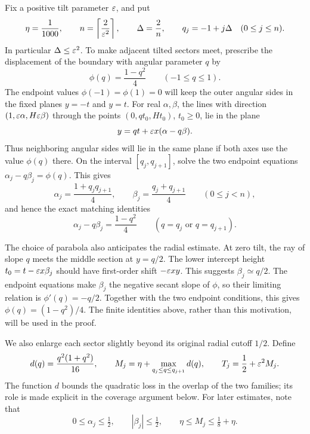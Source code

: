 Fix a positive tilt parameter $\varepsilon$, and put
\begin{equation}\label{eq:parameters}
 \eta=\frac1{1000},\qquad
 n=\left\lceil\frac2{\varepsilon^2}\right\rceil,\qquad
 \Delta=\frac2n,\qquad q_j=-1+j\Delta\quad(0\le j\le n).
\end{equation}
In particular $\Delta\le\varepsilon^2$.
To make adjacent tilted sectors meet, prescribe the displacement of the
boundary with angular parameter $q$ by
\[
 \phi(q)=\frac{1-q^2}{4}\qquad(-1\le q\le1).
\]
The endpoint values $\phi(-1)=\phi(1)=0$ will keep the outer angular
sides in the fixed planes $y=-t$ and $y=t$.
For real $\alpha,\beta$, the lines with direction
$(1,\varepsilon\alpha,H\varepsilon\beta)$ through the points
$(0,qt_0,Ht_0)$, $t_0\ge0$, lie in the plane
\[
 y=qt+\varepsilon x(\alpha-q\beta).
\]
Thus neighboring angular sides will lie in the same plane if both axes
use the value $\phi(q)$ there. On the interval $[q_j,q_{j+1}]$, solve the
two endpoint equations $\alpha_j-q\beta_j=\phi(q)$. This gives
\begin{equation}\label{eq:axis-coefficients}
 \alpha_j=\frac{1+q_jq_{j+1}}4,
 \qquad \beta_j=\frac{q_j+q_{j+1}}4
 \qquad(0\le j<n),
\end{equation}
and hence the exact matching identities
\begin{equation}\label{eq:shared-boundaries}
 \alpha_j-q\beta_j=\frac{1-q^2}{4}
 \qquad(q=q_j\text{ or }q=q_{j+1}).
\end{equation}

The choice of parabola also anticipates the radial estimate. At zero
tilt, the ray of slope $q$ meets the middle section at $y=q/2$.
The lower intercept height
$t_0=t-\varepsilon x\beta_j$ should have first-order shift $-\varepsilon xy$.
This suggests $\beta_j\simeq q/2$. The endpoint equations make
$\beta_j$ the negative secant slope of $\phi$, so their limiting
relation is $\phi'(q)=-q/2$. Together with the two endpoint conditions,
this gives $\phi(q)=(1-q^2)/4$. The finite identities above, rather
than this motivation, will be used in the proof.

We also enlarge each sector slightly beyond its original radial cutoff
$1/2$. Define
\begin{equation}\label{eq:cutoffs}
 d(q)=\frac{q^2(1+q^2)}{16},\qquad
 M_j=\eta+\max_{q_j\le q\le q_{j+1}}d(q),\qquad
 T_j=\frac12+\varepsilon^2M_j.
\end{equation}
The function $d$ bounds the quadratic loss in the overlap of the two
families; its role is made explicit in the coverage argument below.
For later estimates, note that
\begin{equation}\label{eq:coefficient-bounds}
 0\le\alpha_j\le\tfrac12,\qquad |\beta_j|\le\tfrac12,
 \qquad \eta\le M_j\le\tfrac18+\eta.
\end{equation}

